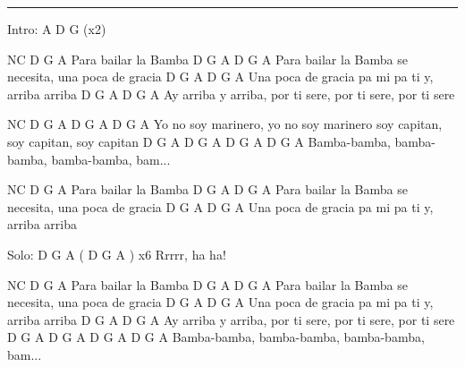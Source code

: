 \noindent\rule{\columnwidth}{1pt}

\begin{lstsong}
Intro: A D G (x2)

NC              D   G A
Para bailar la Bamba
                D        G   A                  D   G A
Para bailar la Bamba se necesita, una poca de gracia
              D       G     A               D  G A
Una poca de gracia pa mi pa ti y, arriba arriba 
               D        G   A            D         G   A
Ay arriba y arriba, por ti sere, por ti sere, por ti sere

NC             D  G A               D        G   A            D        G   A
Yo no soy marinero,  yo no soy marinero soy capitan, soy capitan, soy capitan
 D  G  A      D  G  A      D  G  A      D  G  A
Bamba-bamba, bamba-bamba, bamba-bamba, bam...

NC              D   G A
Para bailar la Bamba
                D        G   A                  D   G A
Para bailar la Bamba se necesita, una poca de gracia
              D       G     A               D  G A
Una poca de gracia pa mi pa ti y, arriba arriba 

Solo: D G A               ( D G A ) x6
            Rrrrr, ha ha!

NC              D   G A
Para bailar la Bamba
                D        G   A                  D   G A
Para bailar la Bamba se necesita, una poca de gracia
              D       G     A               D  G A
Una poca de gracia pa mi pa ti y, arriba arriba 
               D        G   A            D         G   A
Ay arriba y arriba, por ti sere, por ti sere, por ti sere
 D  G  A      D  G  A      D  G  A      D  G  A
Bamba-bamba, bamba-bamba, bamba-bamba, bam...
\end{lstsong}


